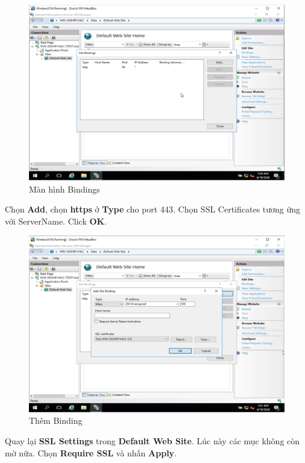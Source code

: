 \begin{figure}[!htb]
    \centering
    \includegraphics[width=0.9\linewidth]{figure//chapter4//lab4_2/bindings.png}
    \caption{Màn hình Bindings}
    \label{fig:enter-label}
\end{figure}

 Chọn \textbf{Add}, chọn \textbf{https} ở \textbf{Type} cho port 443. Chọn SSL Certificates tương ứng với ServerName. Click \textbf{OK}.

\begin{figure}[!htb]
    \centering
    \includegraphics[width=0.9  \linewidth]{figure//chapter4//lab4_2/add_bindings.png}
    \caption{Thêm Binding}
    \label{fig:enter-label}
\end{figure}

 Quay lại \textbf{SSL Settings} trong \textbf{Default Web Site}. Lúc này các mục không còn mờ nữa. Chọn \textbf{Require SSL} và nhấn \textbf{Apply}.

